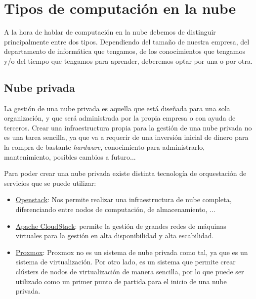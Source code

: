 \chapter{Tipos de computación en la nube}

A la hora de hablar de computación en la nube debemos de distinguir principalmente entre dos tipos. Dependiendo del tamaño de nuestra empresa, del departamento de informática que tengamos, de los conocimientos que tengamos y/o del tiempo que tengamos para aprender, deberemos optar por una o por otra.

\section{Nube privada}

La gestión de una nube privada es aquella que está diseñada para una sola organización, y que será administrada por la propia empresa o con ayuda de terceros. Crear una infraestructura propia para la gestión de una nube privada no es una tarea sencilla, ya que va a requerir de una inversión inicial de dinero para la compra de bastante \textit{hardware}, conocimiento para administrarlo, mantenimiento, posibles cambios a futuro...


Para poder crear una nube privada existe distinta tecnología de orquestación de servicios que se puede utilizar:

\begin{itemize}
	\item \href{https://www.openstack.org/}{Openstack}: Nos permite realizar una infraestructura de nube completa, diferenciando entre nodos de computación, de almacenamiento, ...
	
	\item \href{https://cloudstack.apache.org/}{Apache CloudStack}: permite la gestión de grandes redes de máquinas virtuales para la gestión en alta disponibilidad y alta escabilidad.
	
	\item \href{https://www.proxmox.com/en/proxmox-virtual-environment/overview}{Proxmox}: Proxmox no es un sistema de nube privada como tal, ya que es un sistema de virtualización. Por otro lado, es un sistema que permite crear clústers de nodos de virtualización de manera sencilla, por lo que puede ser utilizado como un primer punto de partida para el inicio de una nube privada.
\end{itemize}



